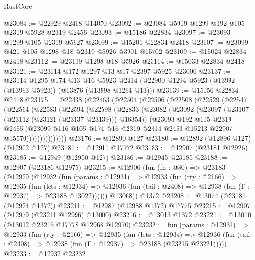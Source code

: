 \begin{lexlean}{RustCore}
\begin{coremodule}
@23084 := @22929 @2418 @14070
@23092 := @23084 @5919 @1299 @192 @105 @2319 @5928 @2319 @2456
@23093 := @15186 @22834
@23097 := @23093 @1299 @105 @2319 @5927
@23099 := @15201 @22834 @2418
@23107 := @23099 @421 @105 @1298 @18 @2319 @5926 @3901 @15702
@23109 := @15024 @22834 @2418
@23112 := @23109 @1298 @18 @5926
@23114 := @15033 @22834 @2418
@23121 := @23114 @172 @1297 @13 @17 @2397 @5925 @23006
@23137 := @23114
    @1295
    @174
    @13
    @16
    @5923
    @2414
    (@22900 @1294 @5923 (@13992 (@13993 @5923)) (@13876 (@13998 @1294 @13)))
@23139 := @15056 @22834 @2418
@23175 := @22438
    (@22463
      (@22504
        (@22506
          (@22508
            (@22529
              (@22547
                (@22564
                  (@22583
                    (@22594
                      (@22598
                        (@22833
                          (@23082
                            (@23092
                              (@23097 (@23107 (@23112 (@23121 (@23137 @23139))) @16354))
                              (@23093
                                @192
                                @105
                                @2319
                                @2455
                                (@23099
                                  @116
                                  @105
                                  @174
                                  @16
                                  @2319
                                  @2414
                                  @2453
                                  @15213
                                  @22907
                                  @15570)))))))))))))))
@23176 := @12890 @127
@23180 := @12892 (@12896 @127) (@12902 @127)
@23181 := @12911 @17772
@23183 := @12907 (@23181 @12926)
@23185 := @12949 (@12950 @127)
@23186 := @12945 @23185
@23188 := @12907 (@23186 @12975)
@23205 := @12906
    (fun (fn : @80) =>
    @23183
      (@12929
        (@12932
          (fun (params : @12931) =>
          @12933
            (fun (rty : @2166) =>
            @12935
              (fun (lets : @12934) =>
              @12936 (fun (tail : @2408) => @12938 (fun (Γ : @12937) => @23188 @13022))))))
        @13068))
    @1372
@23208 := @13074 (@23181 (@12924 @1372))
@23211 := @12987 (@12988 @1372) @17775
@23215 := @12907 (@12979 (@23211 @12996) @13000)
@23216 := @13013 @1372
@23221 := @13010 (@13012 @23216 @17778 @12968 @12970)
@23232 := fun (params : @12931) =>
  @12933
    (fun (rty : @2166) =>
    @12935
      (fun (lets : @12934) =>
      @12936 (fun (tail : @2408) => @12938 (fun (Γ : @12937) => @23188 (@23215 @23221)))))
@23233 := @12932 @23232

\end{coremodule}
\end{lexlean}
